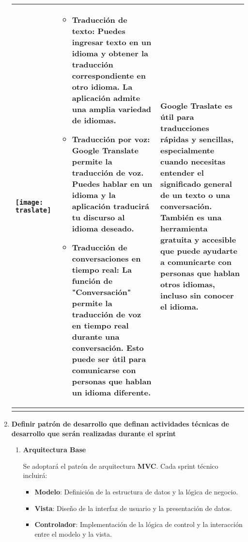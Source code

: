 \begin{doublespace}
\begin{enumerate}[label=\alph*)]
\begin{longtable}{|p{3cm}|p{6cm}|p{6cm}|}
    \raisebox{-\totalheight}{\texttt{[image: \\traslate]}} & 
    \begin{itemize}
        \item Traducción de texto: Puedes ingresar texto en un idioma y obtener la traducción
        correspondiente en otro idioma. La aplicación admite una amplia variedad de idiomas.    
        \item Traducción por voz: Google Translate permite la traducción de voz. Puedes hablar en
        un idioma y la aplicación traducirá tu discurso al idioma deseado.
        \item Traducción de conversaciones en tiempo real: La función de "Conversación" permite
        la traducción de voz en tiempo real durante una conversación. Esto puede ser útil para
        comunicarse con personas que hablan un idioma diferente.




 

    \end{itemize} & 
    Google Traslate es útil para traducciones rápidas y sencillas, especialmente cuando necesitas entender 
    el significado general de un texto o una conversación. También es una 
    herramienta gratuita y accesible que puede ayudarte a comunicarte con personas que hablan otros idiomas, 
    incluso sin conocer el idioma.\\
    \hline

            \hline
            \rowcolor{bleudefrance} \multicolumn{3}{c|}{} \\
            \hline
            
            \end{longtable}               

\newpage

    \item \large\textbf{Definir patrón de desarrollo que definan actividades técnicas de desarrollo que serán realizadas
    durante el sprint}
    
    \begin{enumerate}
        
        \item \textbf {Arquitectura Base}\par
        Se adoptará el patrón de arquitectura \textbf{MVC}. Cada sprint técnico incluirá:
        \begin{itemize}
            \item \textbf{Modelo}: Definición de la estructura de datos y la lógica de negocio.
            \item \textbf{Vista}: Diseño de la interfaz de usuario y la presentación de datos.
            \item \textbf{Controlador}: Implementación de la lógica de control y la interacción entre el modelo y la vista.
        \end{itemize}


\end{enumerate}
\end{enumerate}
\end{doublespace}

